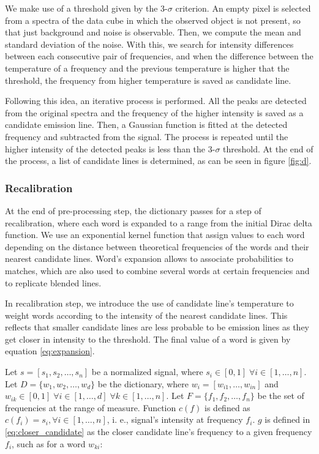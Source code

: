 We make use of a threshold given by the 3-$\sigma$ criterion.
An empty pixel is selected from a spectra of the data cube in which the observed object is not present, so that just background and noise is observable.
Then, we compute the mean and standard deviation of the noise.
With this, we search for intensity differences between each consecutive pair of frequencies, and when the difference between the temperature of a frequency and the previous temperature is higher that the threshold, the frequency from higher temperature is saved as candidate line.

Following this idea, an iterative process is performed.
All the peaks are detected from the original spectra and the frequency of the higher intensity is saved as a candidate emission line.
Then, a Gaussian function is fitted at the detected frequency and subtracted from the signal. The process is repeated until the higher intensity of the detected peaks is less than the  3-$\sigma$ threshold.
At the end of the process, a list of candidate lines is determined, as can be seen in figure \ref{fig:d}.

\subsubsection{Recalibration}

At the end of pre-processing step, the dictionary passes for a step of recalibration, where each word is expanded to a range from the initial Dirac delta function.
We use an exponential kernel function that assign values to each word depending on the distance between theoretical frequencies of the words and their nearest candidate lines.
Word's expansion allows to associate probabilities to matches, which are also used to combine several words at certain frequencies and to replicate blended lines.

In recalibration step, we introduce the use of candidate line's temperature to weight words according to the intensity of the nearest candidate lines.
This reflects that smaller candidate lines are less probable to be emission lines as they get closer in intensity to the threshold.
The final value of a word is given by equation \ref{eq:expansion}.

Let $s = [s_1, s_2, \ldots, s_n]$ be a normalized signal, where $s_i \in [0, 1] \; \forall i \in [1, \ldots, n]$.
Let $D = \{ w_1, w_2, \ldots, w_d \}$ be the dictionary, where $w_i = [w_{i1}, \ldots, w_{in} ]$ and $w_{ik} \in [0,1] \; \forall i \in [1, \ldots, d] \; \forall k \in [1, \ldots, n]$.
Let $F = \{ f_1, f_2, \ldots, f_n \}$ be the set of frequencies at the range of measure. 
Function $c(f)$ is defined as $c(f_i) = s_i, \forall i \in [1, \ldots, n]$, i. e., signal's intensity at frequency $f_i$.
$g$ is defined in \ref{eq:closer_candidate} as the closer candidate line's frequency to a given frequency $f_i$, such as for a word $w_{ki}$:

